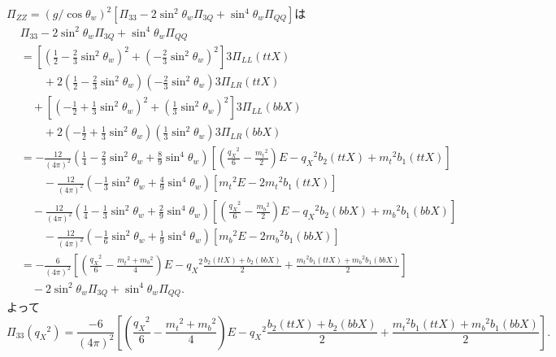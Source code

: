 $\Pi_{ZZ} = (g/\cos\theta_w)^2[\Pi_{33} - 2\sin^2\theta_w \Pi_{3Q} + \sin^4\theta_w \Pi_{QQ}]$は
\begin{align*}
  & \Pi_{33} - 2\sin^2\theta_w \Pi_{3Q} + \sin^4\theta_w \Pi_{QQ} \\
  &= \left[ \left( \frac{1}{2} - \frac{2}{3} \sin^2\theta_w \right)^2 + \left( -\frac{2}{3} \sin^2\theta_w \right)^2 \right] 3 \Pi_{LL}(ttX) \\
  &\qquad + 2 \left( \frac{1}{2} - \frac{2}{3} \sin^2\theta_w \right) \left( -\frac{2}{3} \sin^2\theta_w \right) 3\Pi_{LR}(ttX) \\
  &\quad + \left[ \left( -\frac{1}{2} + \frac{1}{3} \sin^2\theta_w \right)^2 + \left( \frac{1}{3} \sin^2\theta_w \right)^2 \right] 3 \Pi_{LL}(bbX) \\
  &\qquad + 2 \left( -\frac{1}{2} + \frac{1}{3} \sin^2\theta_w \right) \left( \frac{1}{3} \sin^2\theta_w \right) 3\Pi_{LR}(bbX) \\
  &= - \frac{12}{(4\pi)^2} \left( \frac{1}{4} - \frac{2}{3} \sin^2\theta_w + \frac{8}{9} \sin^4\theta_w \right)
  \left[ \left( \frac{q_X{}^2}{6} - \frac{m_t{}^2}{2} \right)E - q_X{}^2 b_2(ttX) + m_t{}^2 b_1(ttX) \right] \\
  &\qquad - \frac{12}{(4\pi)^2} \left( -\frac{1}{3} \sin^2\theta_w + \frac{4}{9} \sin^4\theta_w \right) [m_t{}^2 E - 2m_t{}^2 b_1(ttX)] \\
  &\quad - \frac{12}{(4\pi)^2} \left( \frac{1}{4} - \frac{1}{3} \sin^2\theta_w + \frac{2}{9} \sin^4\theta_w \right)
  \left[ \left( \frac{q_X{}^2}{6} - \frac{m_b{}^2}{2} \right)E - q_X{}^2 b_2(bbX) + m_b{}^2 b_1(bbX) \right] \\
  &\qquad - \frac{12}{(4\pi)^2} \left( -\frac{1}{6} \sin^2\theta_w + \frac{1}{9} \sin^4\theta_w \right) [m_b{}^2 E - 2m_b{}^2 b_1(bbX)] \\
  &= - \frac{6}{(4\pi)^2} \left[\left(\frac{q_X{}^2}{6} - \frac{m_t{}^2+m_b{}^2}{4} \right) E - q_X{}^2 \frac{b_2(ttX)+b_2(bbX)}{2}
  + \frac{m_t{}^2b_1(ttX)+m_b{}^2b_1(bbX)}{2} \right] \\
  &\quad - 2\sin^2\theta_w \Pi_{3Q} + \sin^4\theta_w \Pi_{QQ} .
\end{align*}
よって
\[
\Pi_{33}(q_X{}^2) = \frac{-6}{(4\pi)^2} \left[\left(\frac{q_X{}^2}{6} - \frac{m_t{}^2+m_b{}^2}{4} \right) E - q_X{}^2 \frac{b_2(ttX)+b_2(bbX)}{2}
+ \frac{m_t{}^2b_1(ttX)+m_b{}^2b_1(bbX)}{2} \right] .
\]
